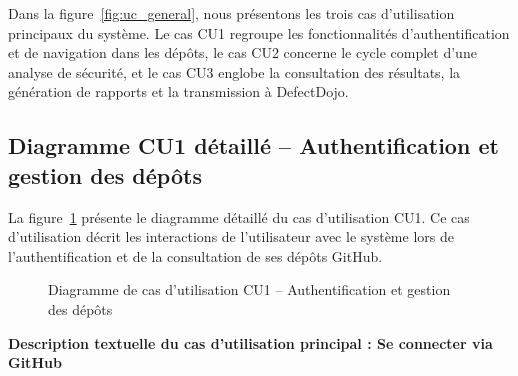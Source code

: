 \documentclass[12pt, a4paper, oneside]{report}
\begin{document}
Dans la figure~\ref{fig:uc_general}, nous présentons les trois cas d'utilisation
principaux du système. Le cas CU1 regroupe les fonctionnalités d'authentification
et de navigation dans les dépôts, le cas CU2 concerne le cycle complet d'une
analyse de sécurité, et le cas CU3 englobe la consultation des résultats, la
génération de rapports et la transmission à DefectDojo.

\subsection{Diagramme CU1 détaillé -- Authentification et gestion des dépôts}
\label{subsec:uc1}

La figure~\ref{fig:uc1} présente le diagramme détaillé du cas d'utilisation CU1.
Ce cas d'utilisation décrit les interactions de l'utilisateur avec le système
lors de l'authentification et de la consultation de ses dépôts GitHub.

\begin{figure}[H]
    \centering
    \caption{Diagramme de cas d'utilisation CU1 -- Authentification et gestion des dépôts}
    \label{fig:uc1}
\end{figure}

\textbf{Description textuelle du cas d'utilisation principal : Se connecter via GitHub}
\end{document}
